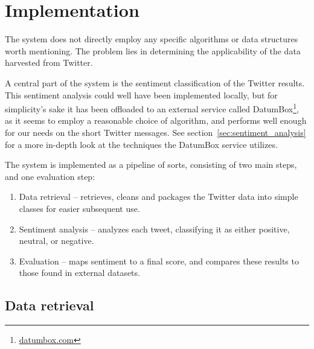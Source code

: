
\chapter{Implementation} %

\label{Chapter4} %




The system does not directly employ any specific algorithms or data structures worth mentioning.
The problem lies in determining the applicability of the data harvested from Twitter.

A central part of the system is the sentiment classification of the Twitter results.
This sentiment analysis could well have been implemented locally, but for simplicity's sake it has been offloaded to an external service called DatumBox\footnote{\url{datumbox.com}}, as it seems to employ a reasonable choice of algorithm, and performs well enough for our needs on the short Twitter messages.
See section~\ref{sec:sentiment_analysis} for a more in-depth look at the techniques the DatumBox service utilizes.

The system is implemented as a pipeline of sorts, consisting of two main steps, and one evaluation step:
\begin{enumerate}
  \item Data retrieval -- retrieves, cleans and packages the Twitter data into simple classes for easier subsequent use.
  \item Sentiment analysis -- analyzes each tweet, classifying it as either positive, neutral, or negative.
  \item Evaluation -- maps sentiment to a final score, and compares these results to those found in external datasets.
\end{enumerate}

\section{Data retrieval} %
\label{sec:data_retrieval}

